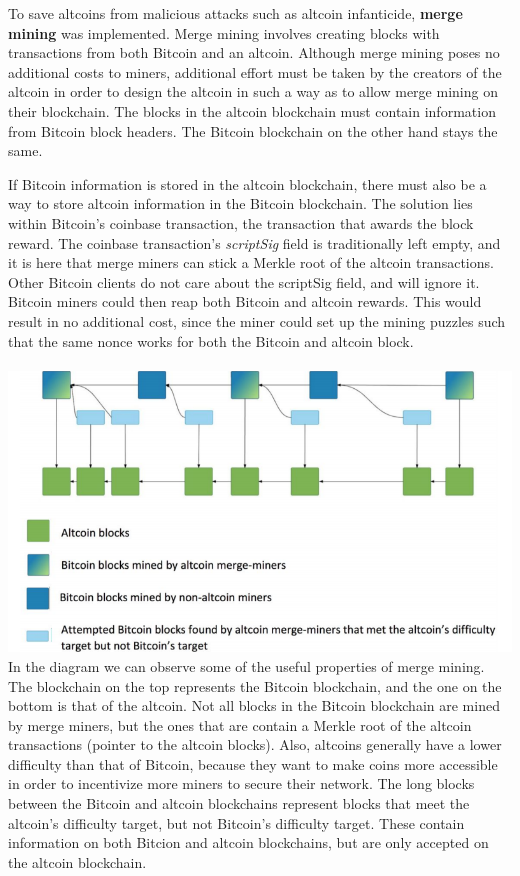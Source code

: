 \documentclass[full.tex]{subfiles}
\begin{document}
    To save altcoins from malicious attacks such as altcoin infanticide, \textbf{merge mining} was implemented. Merge mining involves creating blocks with transactions from both Bitcoin and an altcoin. Although merge mining poses no additional costs to miners, additional effort must be taken by the creators of the altcoin in order to design the altcoin in such a way as to allow merge mining on their blockchain. The blocks in the altcoin blockchain must contain information from Bitcoin block headers. The Bitcoin blockchain on the other hand stays the same.
    
    If Bitcoin information is stored in the altcoin blockchain, there must also be a way to store altcoin information in the Bitcoin blockchain. The solution lies within Bitcoin's coinbase transaction, the transaction that awards the block reward. The coinbase transaction's \textit{scriptSig} field is traditionally left empty, and it is here that merge miners can stick a Merkle root of the altcoin transactions. Other Bitcoin clients do not care about the scriptSig field, and will ignore it. Bitcoin miners could then reap both Bitcoin and altcoin rewards. This would result in no additional cost, since the miner could set up the mining puzzles such that the same nonce works for both the Bitcoin and altcoin block. \\ \\
     
   \includegraphics[scale=0.5]{merge} \\
   
   In the diagram we can observe some of the useful properties of merge mining. The blockchain on the top represents the Bitcoin blockchain, and the one on the bottom is that of the altcoin. Not all blocks in the Bitcoin blockchain are mined by merge miners, but the ones that are contain a Merkle root of the altcoin transactions (pointer to the altcoin blocks). Also, altcoins generally have a lower difficulty than that of Bitcoin, because they want to make coins more accessible in order to incentivize more miners to secure their network. The long blocks between the Bitcoin and altcoin blockchains represent blocks that meet the altcoin's difficulty target, but not Bitcoin's difficulty target. These contain information on both Bitcion and altcoin blockchains, but are only accepted on the altcoin blockchain.
   
\end{document}
